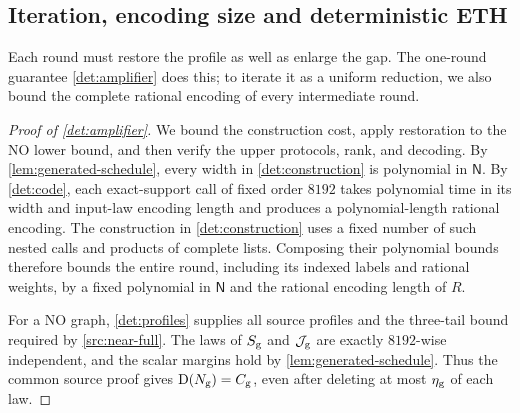 \documentclass[11pt]{article} \usepackage[utf8]{inputenc}
\theoremstyle{plain} \newtheorem{theorem}{Theorem}[section]
\theoremstyle{definition} \newaliascnt{definition}{theorem}
\newcommand{\D}{\operatorname{D}}
\begin{document}
\subsection{Iteration, encoding size and deterministic ETH}

Each round must restore the profile as well as enlarge the gap. The one-round
guarantee \cref{det:amplifier} does this; to iterate it as a uniform reduction,
we also bound the complete rational encoding of every intermediate round.

\begin{proof}[Proof of \cref{det:amplifier}]
We bound the construction cost, apply restoration to the NO lower bound, and
then verify the upper protocols, rank, and decoding. By
\cref{lem:generated-schedule}, every width in \cref{det:construction} is
polynomial in \(\mathsf N\). By \cref{det:code}, each exact-support call of
fixed order \(8192\) takes polynomial time in its width and input-law encoding
length and produces a polynomial-length rational encoding. The construction in
\cref{det:construction} uses a fixed number of such nested calls and products of
complete lists. Composing their polynomial bounds therefore bounds the entire
round, including its indexed labels and rational weights, by a fixed polynomial
in \(\mathsf N\) and the rational encoding length of \(R\).

For a NO graph, \cref{det:profiles} supplies all source profiles and
the three-tail bound required by \cref{src:near-full}. The laws of $S_{\rm g}$
and $\mathcal J_{\rm g}$ are exactly $8192$-wise independent, and the
scalar margins hold by \cref{lem:generated-schedule}. Thus the common source
proof gives $\D(N_{\rm g})=C_{\rm g}$, even after deleting at most
$\eta_{\rm g}$ of each law.


\end{proof}
\end{document}
